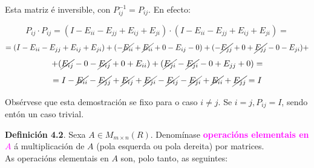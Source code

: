 \documentclass[twoside]{report}
\newcommand{\magbf}[1]{\textcolor{magenta}{\textbf{#1}}} %
\theoremstyle{mystyle}
\begin{document}
\begin{enumerate}
\begin{center}
        
    \end{center}
    
    \vspace{5mm}
    
    Esta matriz é inversible, con $P_{ij}^{-1} = P_{ij}$. En efecto:
    
    $$P_{ij} \cdot P_{ij} = (I - E_{ii} - E_{jj} + E_{ij} + E_{ji}) \cdot (I - E_{ii} - E_{jj} + E_{ij} + E_{ji}) = $$
    $$ = (I - E_{ii} - E_{jj} + E_{ij} + E_{ji}) + (-\cancel{E_{ii}} + \cancel{E_{ii}} + 0 - E_{ij} - 0) + (-\cancel{E_{jj}} + 0 + \cancel{E_{jj}} - 0 - E_{ji}) + $$
    $$ + (\cancel{E_{ij}} - 0 - \cancel{E_{ij}} + 0 + E_{ii}) + (\cancel{E_{ji}} - \cancel{E_{ji}} -0 + E_{jj} + 0) = $$
    $$ = I - \cancel{E_{ii}} - \cancel{E_{jj}} + \cancel{E_{ij}} + \cancel{E_{ji}} - \cancel{E_{ij}} - \cancel{E_{ji}} + \cancel{E_{ii}} + \cancel{E_{jj}} = I$$
    
    \vspace{5mm}
    
    Obsérvese que esta demostración se fixo para o caso $i \neq j$. Se $i = j, P_{ij} = I$, sendo entón un caso trivial.\\
    
\end{enumerate}

\noindent \textbf{Definición 4.2}. Sexa $A \in M_{m \times n}(R)$. Denomínase \magbf{operacións elementais en $A$} á multiplicación de $A$ (pola esquerda ou pola dereita) por matrices.\\

\noindent As operacións elementais en $A$ son, polo tanto, as seguintes:
\end{document}
